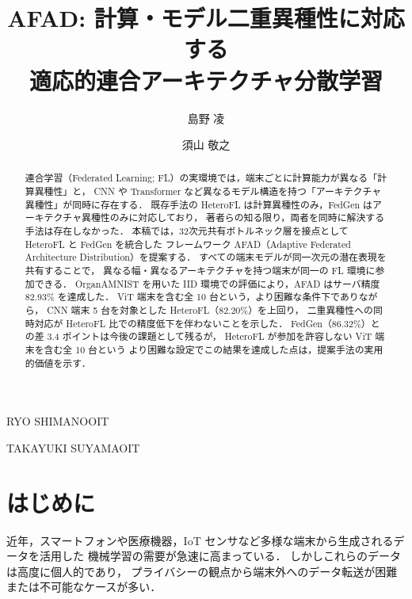 \documentclass[Japanese,noauthor]{dicomopapers}
\begin{document}
\title{AFAD: 計算・モデル二重異種性に対応する\\適応的連合アーキテクチャ分散学習}




\author{島野 凌}{RYO SHIMANO}{OIT}
\author{須山 敬之}{TAKAYUKI SUYAMA}{OIT}

\begin{abstract}
  連合学習（Federated Learning; FL）の実環境では，端末ごとに計算能力が異なる「計算異種性」と，
  CNN や Transformer など異なるモデル構造を持つ「アーキテクチャ異種性」が同時に存在する．
  既存手法の HeteroFL は計算異種性のみ，FedGen はアーキテクチャ異種性のみに対応しており，
  著者らの知る限り，両者を同時に解決する手法は存在しなかった．
  本稿では，32次元共有ボトルネック層を接点として HeteroFL と FedGen を統合した
  フレームワーク AFAD（Adaptive Federated Architecture Distribution）を提案する．
  すべての端末モデルが同一次元の潜在表現を共有することで，
  異なる幅・異なるアーキテクチャを持つ端末が同一の FL 環境に参加できる．
  OrganAMNIST を用いた IID 環境での評価により，AFAD はサーバ精度 82.93\% を達成した．
  ViT 端末を含む全 10 台という，より困難な条件下でありながら，
  CNN 端末 5 台を対象とした HeteroFL（82.20\%）を上回り，
  二重異種性への同時対応が HeteroFL 比での精度低下を伴わないことを示した．
  FedGen（86.32\%）との差 3.4 ポイントは今後の課題として残るが，
  HeteroFL が参加を許容しない ViT 端末を含む全 10 台という
  より困難な設定でこの結果を達成した点は，提案手法の実用的価値を示す．
\end{abstract}

\maketitle

\section{はじめに}

近年，スマートフォンや医療機器，IoT センサなど多様な端末から生成されるデータを活用した
機械学習の需要が急速に高まっている．
しかしこれらのデータは高度に個人的であり，
プライバシーの観点から端末外へのデータ転送が困難または不可能なケースが多い．
\end{document}
